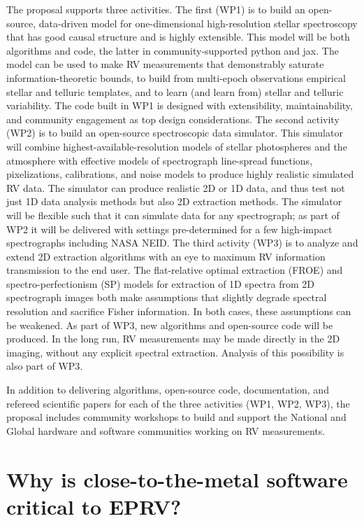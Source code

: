 \documentclass[12pt]{article}
\begin{document}
{The proposal supports three activities. The first (WP1) is to build an open-source, data-driven model for one-dimensional high-resolution stellar spectroscopy that has good causal structure and is highly extensible. This model will be both algorithms and code, the latter in community-supported python and jax. The model can be used to make RV measurements that demonstrably saturate information-theoretic bounds, to build from multi-epoch observations empirical stellar and telluric templates, and to learn (and learn from) stellar and telluric variability. The code built in WP1 is designed with extensibility, maintainability, and community engagement as top design considerations.
The second activity (WP2) is to build an open-source spectroscopic data simulator. This simulator will combine highest-available-resolution models of stellar photospheres and the atmosphere with effective models of spectrograph line-spread functions, pixelizations, calibrations, and noise models to produce highly realistic simulated RV data. The simulator can produce realistic 2D or 1D data, and thus test not just 1D data analysis methods but also 2D extraction methods. The simulator will be flexible such that it can simulate data for any spectrograph; as part of WP2 it will be delivered with settings pre-determined for a few high-impact spectrographs including NASA NEID.
The third activity (WP3) is to analyze and extend 2D extraction algorithms with an eye to maximum RV information transmission to the end user. The flat-relative optimal extraction (FROE) and spectro-perfectionism (SP) models for extraction of 1D spectra from 2D spectrograph images both make assumptions that slightly degrade spectral resolution and sacrifice Fisher information. In both cases, these assumptions can be weakened. As part of WP3, new algorithms and open-source code will be produced. In the long run, RV measurements may be made directly in the 2D imaging, without any explicit spectral extraction. Analysis of this possibility is also part of WP3.

In addition to delivering algorithms, open-source code, documentation, and refereed scientific papers for each of the three activities (WP1, WP2, WP3), the proposal includes community workshops to build and support the National and Global hardware and software communities working on RV measurements.}

\section*{Why is close-to-the-metal software critical to EPRV?}
\end{document}
